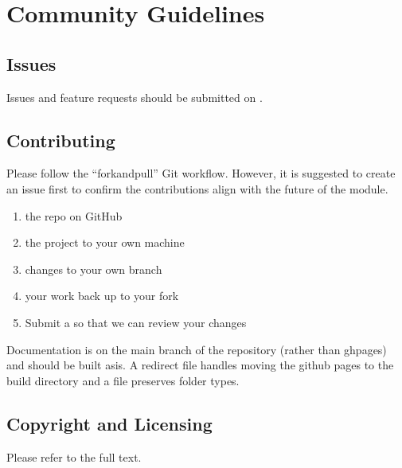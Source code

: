 \documentclass[letterpaper,10pt,english]{sphinxmanual}
\begin{document}
\section{Community Guidelines}
\label{\detokenize{community:community-guidelines}}\label{\detokenize{community::doc}}

\subsection{Issues}
\label{\detokenize{community:issues}}
\sphinxAtStartPar
Issues and feature requests should be submitted on  .


\subsection{Contributing}
\label{\detokenize{community:contributing}}
\sphinxAtStartPar
Please follow the “fork\sphinxhyphen{}and\sphinxhyphen{}pull” Git workflow.
However, it is suggested to create an issue first to confirm the contributions align with the future of the module.
\begin{enumerate}
%
\item {} 
\sphinxAtStartPar
{} the repo on GitHub

\item {} 
\sphinxAtStartPar
{} the project to your own machine

\item {} 
\sphinxAtStartPar
{} changes to your own branch

\item {} 
\sphinxAtStartPar
{} your work back up to your fork

\item {} 
\sphinxAtStartPar
Submit a  so that we can review your changes

\end{enumerate}

\sphinxAtStartPar
Documentation is on the main branch of the repository (rather than gh\sphinxhyphen{}pages) and should be built as\sphinxhyphen{}is.
A redirect  file handles moving the github pages to the build directory and a  file
preserves folder types.


\subsection{Copyright and Licensing}
\label{\detokenize{community:copyright-and-licensing}}
\sphinxAtStartPar
Please refer to the full  text.
\end{document}
